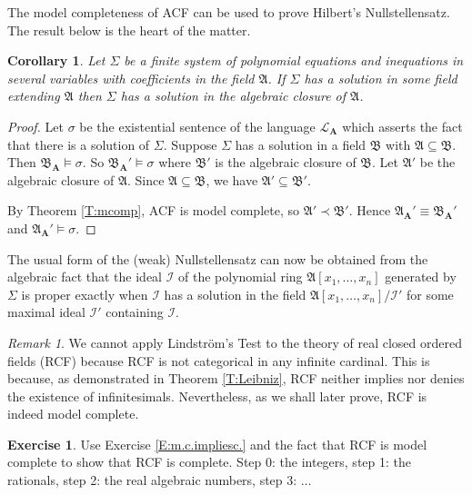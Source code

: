 \documentclass[titlepage, oneside]{amsbook}
\theoremstyle{plain}
\newtheorem{corollary}{Corollary}
\theoremstyle{definition}
\newtheorem{exercise}{Exercise}
\theoremstyle{remark}
\newtheorem*{rem}{Remark}
\newcommand{\lan}{\ensuremath{\mathcal{L}}}
\newcommand{\seq}{\ensuremath{\subseteq}}
\newcommand{\ma}{\ensuremath{\mathfrak{A}}}
\newcommand{\mb}{\ensuremath{\mathfrak{B}}}
\newcommand{\ba}{\ensuremath{\mathbf{A}}}
\begin{document}
The model completeness of ACF can be used to prove Hilbert's Nullstellensatz. The result below is the heart of the matter.
\begin{corollary}

Let $\Sigma$ be a finite system of polynomial equations and inequations 
in several variables with coefficients in the field $\ma$. If $\Sigma$ 
has a solution in some field extending $\ma$ then $\Sigma$ has a solution 
in the algebraic closure of $\ma$.
\end{corollary}

\begin{proof} Let $\sigma$ be the existential sentence of the language 
$\lan_\ba$ which asserts the fact that there is a solution of $\Sigma$.  
Suppose $\Sigma$ has a solution in a field $\mb$ with $\ma \seq \mb$. 
Then $\mb_\ba \models \sigma$.
So $\mb_{\ba}' \models \sigma$ where $\mb'$ is the algebraic closure of 
\mb. Let $\ma'$ be the algebraic closure of \ma. Since $\ma \seq \mb$, we 
have $\ma' \seq \mb'$.

By Theorem \ref{T:mcomp}, ACF is model complete, so $\ma' \prec \mb'$. 
Hence $\ma_\ba' \equiv \mb_\ba'$ and $\ma_\ba' \models \sigma$. 
\end{proof}

The usual form of the (weak) Nullstellensatz can now be obtained from the algebraic fact that the ideal $\mathcal{I}$ of the polynomial ring $\ma [x_{1}, \dots , x_{n} ]$ generated by $\Sigma$ is proper exactly when $\mathcal{I}$ has a solution in the field $\ma [x_{1}, \dots , x_{n} ] / \mathcal{I'}$ for some maximal ideal $\mathcal{I'}$ containing $\mathcal{I}$.


\begin{rem} 
We cannot apply Lindstr\"{o}m's Test to the theory of real closed ordered fields 
(RCF) because RCF is not categorical in any infinite cardinal. This is because, as 
demonstrated in Theorem \ref{T:Leibniz}, RCF neither implies nor denies the existence of infinitesimals. Nevertheless, as we shall later prove, RCF is indeed model complete.
\end{rem}
\begin{exercise}\label{E:m.c.RCF}
Use Exercise \ref{E:m.c.impliesc.} and the fact that RCF is model complete to show that  RCF is complete.
Step 0: the integers, step 1: the rationals, step 2: the real algebraic numbers, step 3: ${\dots}$
\end{exercise}
\end{document}
